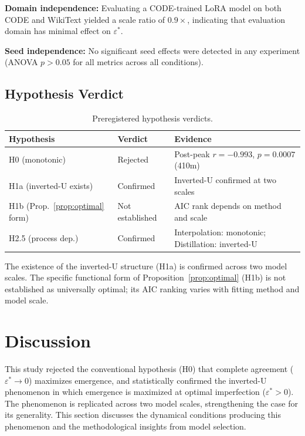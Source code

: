 \documentclass[11pt,a4paper]{article}
\begin{document}
\textbf{Domain independence:} Evaluating a CODE-trained LoRA model on both CODE and WikiText
yielded a scale ratio of $0.9\times$, indicating that evaluation domain has minimal effect on
$\varepsilon^*$.

\textbf{Seed independence:} No significant seed effects were detected in any experiment
(ANOVA $p > 0.05$ for all metrics across all conditions).

\subsection{Hypothesis Verdict}

\begin{table}[t]
\centering
\caption{Preregistered hypothesis verdicts.}
\label{tab:verdict}
\begin{tabular}{lll}
\toprule
Hypothesis & Verdict & Evidence \\
\midrule
H0 (monotonic) & Rejected & Post-peak $r = -0.993$, $p = 0.0007$ (410m) \\
H1a (inverted-U exists) & Confirmed & Inverted-U confirmed at two scales \\
H1b (Prop.~\ref{prop:optimal} form) & Not established & AIC rank depends on method and scale \\
H2.5 (process dep.) & Confirmed & Interpolation: monotonic; Distillation: inverted-U \\
\bottomrule
\end{tabular}
\end{table}

The existence of the inverted-U structure (H1a) is confirmed across two model scales. The
specific functional form of Proposition~\ref{prop:optimal} (H1b) is not established as
universally optimal; its AIC ranking varies with fitting method and model scale.

\section{Discussion}

This study rejected the conventional hypothesis (H0) that complete agreement
($\varepsilon^* \to 0$) maximizes emergence, and statistically confirmed the inverted-U
phenomenon in which emergence is maximized at optimal imperfection ($\varepsilon^* > 0$). The
phenomenon is replicated across two model scales, strengthening the case for its generality.
This section discusses the dynamical conditions producing this phenomenon and the methodological
insights from model selection.
\end{document}
